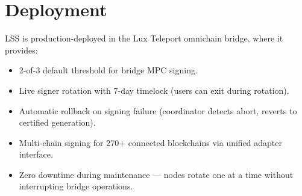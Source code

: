\section{Deployment}


LSS is production-deployed in the Lux Teleport omnichain bridge, where it provides:

\begin{itemize}[nosep]
  \item 2-of-3 default threshold for bridge MPC signing.
  \item Live signer rotation with 7-day timelock (users can exit during rotation).
  \item Automatic rollback on signing failure (coordinator detects abort, reverts to certified generation).
  \item Multi-chain signing for 270+ connected blockchains via unified adapter interface.
  \item Zero downtime during maintenance --- nodes rotate one at a time without interrupting bridge operations.
\end{itemize}

